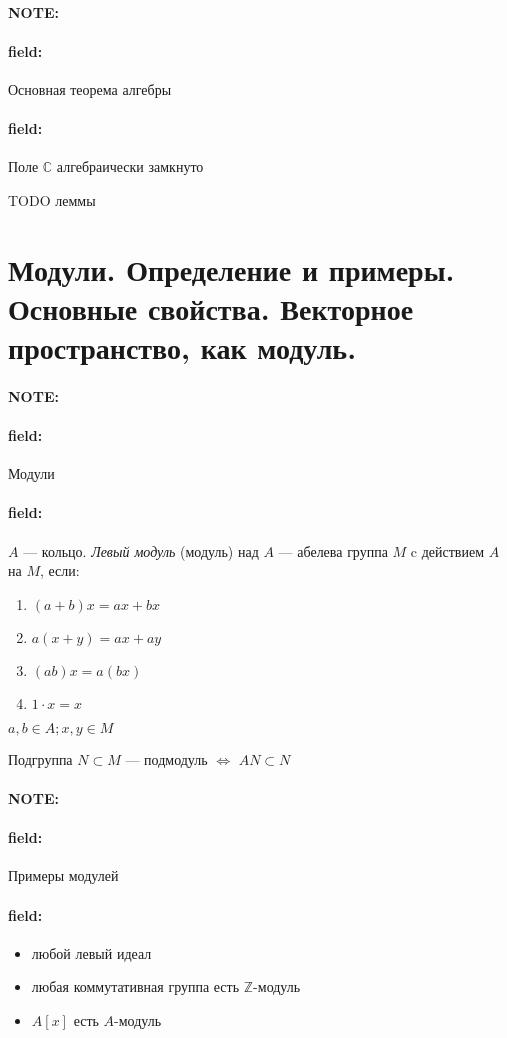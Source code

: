 \documentclass[12pt]{article}
\newenvironment{note}{\paragraph{NOTE:}}{}
\newenvironment{field}{\paragraph{field:}}{}
\begin{document}
\begin{note}
  \begin{field}
    Основная теорема алгебры
  \end{field}
  \begin{field}
    Поле $\mathbb{C}$ алгебраически замкнуто

    TODO леммы
  \end{field}
\end{note}

\section{Модули. Определение и примеры. Основные свойства. Векторное
пространство, как модуль.}

\begin{note}
  \begin{field}
    Модули
  \end{field}
  \begin{field}
    $A$ --- кольцо.
    \emph{Левый модуль} (модуль) над $A$ ---
    абелева группа $M$ c действием $A$ на $M$, если:
    \begin{enumerate}
      \item
      $(a + b)x = ax + bx$
      \item
      $a(x + y) = ax + ay$
      \item
      $(ab)x = a(bx)$
      \item
      $1 \cdot x = x$
    \end{enumerate}
    $a, b \in A; x, y \in M$

    Подгруппа $N \subset M$ --- подмодуль
    $\Leftrightarrow$
    $AN \subset N$
  \end{field}
\end{note}

\begin{note}
  \begin{field}
    Примеры модулей
  \end{field}
  \begin{field}
    \begin{itemize}
      \item
      любой левый идеал
      \item
      любая коммутативная группа есть $\mathbb{Z}$-модуль
      \item
      $A[x]$ есть $A$-модуль
    \end{itemize}
  \end{field}
\end{note}
\end{document}
